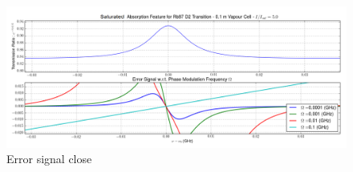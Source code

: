 \begin{figure}
  \centering
  \includegraphics[height=0.5\linewidth, width=\linewidth]
    {rb_D2_error_closer.png}
  \caption{Error signal close}
    \label{fig:error_close}
\end{figure}

